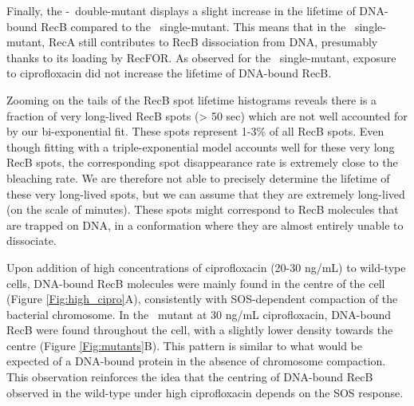 Finally, the \dreca-\teneighty\ double-mutant displays a slight increase in the lifetime of DNA-bound RecB compared to the \teneighty\ single-mutant. This means that in the \teneighty\ single-mutant, RecA still contributes to RecB dissociation from DNA, presumably thanks to its loading by RecFOR. As observed for the \teneighty\ single-mutant, exposure to ciprofloxacin did not increase the lifetime of DNA-bound RecB.

Zooming on the tails of the RecB spot lifetime histograms reveals there is a fraction of very long-lived RecB spots (> 50 sec) which are not well accounted for by our bi-exponential fit. These spots represent 1-3\% of all RecB spots. Even though fitting with a triple-exponential model accounts well for these very long RecB spots, the corresponding spot disappearance rate is extremely close to the bleaching rate. We are therefore not able to precisely determine the lifetime of these very long-lived spots, but we can assume that they are extremely long-lived (on the scale of minutes). These spots might correspond to RecB molecules that are trapped on DNA, in a conformation where they are almost entirely unable to dissociate.

Upon addition of high concentrations of ciprofloxacin (20-30 ng/mL) to wild-type cells, DNA-bound RecB molecules were mainly found in the centre of the cell (Figure \ref{Fig:high_cipro}A), consistently with SOS-dependent compaction of the bacterial chromosome. In the \dreca\ mutant at 30 ng/mL ciprofloxacin, DNA-bound RecB were found throughout the cell, with a slightly lower density towards the centre (Figure \ref{Fig:mutants}B). This pattern is similar to what would be expected of a DNA-bound protein in the absence of chromosome compaction\cite{Stracy2021}. This observation reinforces the idea that the centring of DNA-bound RecB observed in the wild-type under high ciprofloxacin depends on the SOS response.


